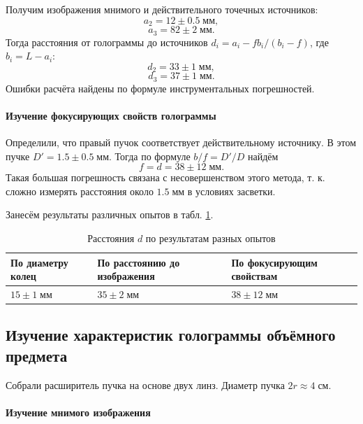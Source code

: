 \documentclass[a4paper]{article}
\begin{document}
Получим изображения мнимого и действительного точечных источников:
\[ a_2 = 12 \pm 0.5 \; мм, \]
\[ a_3 = 82 \pm 2 \; мм. \]
Тогда расстояния от голограммы до источников $ d_i = a_i - f b_i /( b_i-f ) $, где $ b_i = L - a_i $:
\begin{equation*}\label{key}
	d_2 = 33\pm 1\; мм,
\end{equation*}
\begin{equation*}\label{key}
	d_3 = 37\pm 1\; мм.
\end{equation*}
Ошибки расчёта найдены по формуле инструментальных погрешностей.

\paragraph{Изучение фокусирующих свойств голограммы}

Определили, что правый пучок соответствует действительному источнику. 
В этом пучке $ D' = 1.5\pm 0.5 \; мм. $ Тогда по формуле $ b/f = D'/D $ найдём
\[ f = d = 38 \pm 12 \; мм. \]
Такая большая погрешность связана с несовершенством этого метода, т. к. сложно измерять расстояния около $ 1.5 \; мм $ в условиях засветки. 

Занесём результаты различных опытов в табл. \ref{tab:1}.

\begin{table}[h]
	\centering
	\begin{tabular}{|l|l|l|}
		\hline
		По диаметру колец & По расстоянию до изображения & По фокусирующим свойствам \\ \hline
		$15 \pm 1\; мм$   & $35\pm 2\; мм$               & $38\pm 12\; мм$           \\ \hline
	\end{tabular}
	\caption{Расстояния $d$ по результатам разных опытов}
	\label{tab:1}
\end{table}

\subsection{Изучение характеристик голограммы объёмного предмета}

Собрали расширитель пучка на основе двух линз. Диаметр пучка $ 2 r \approx 4 \; см $.

\paragraph{Изучение мнимого изображения}
\end{document}
